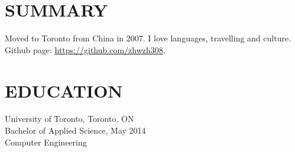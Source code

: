 \documentclass{res}
\begin{document}
 


\address{\bf  Unit 808, 38 Dan Leckie Way\\Toronto, ON M5V 2V6\\(416)
795-0370\\\href{mailto:wenzhong.zhang@mail.utoronto.ca}{wenzhong.zhang@mail.utoronto.ca}}

\begin{resume}

\section{SUMMARY}          
    Moved to Toronto from China in 2007. I love languages, travelling and culture.
    Github page: \url{https://github.com/zhwzh308}.
 
\section{EDUCATION}          
    University of Toronto, Toronto, ON  \\        
    Bachelor of Applied Science, May 2014   \\       
    Computer Engineering       \\   
 

\end{resume}
\end{document}
